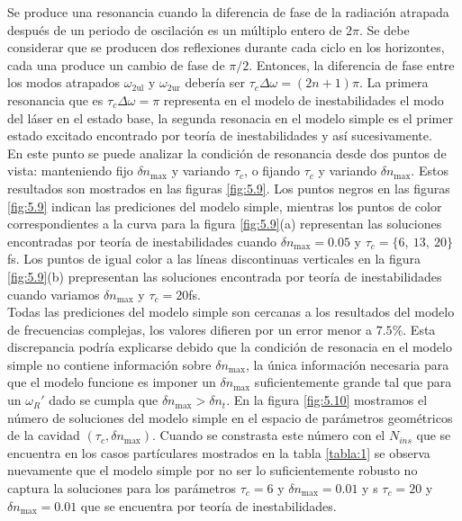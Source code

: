 Se produce una resonancia cuando la diferencia de fase de la radiación atrapada después de un periodo de oscilaci\'{o}n es un múltiplo entero de $2\pi$. Se debe considerar que se producen dos reflexiones durante cada ciclo en
los horizontes, cada una produce un cambio de fase de $\pi/2$. Entonces, la diferencia de fase entre los modos atrapados $ \omega_{\text{2ul}}$ y $\omega_{\text{2ur}}$ debería ser
$\tau_c \Delta \omega=(2n+1)\pi$. La primera resonancia que es $\tau_c \Delta \omega=\pi$ representa en el modelo de inestabilidades el modo del l\'{a}ser en el estado base, la segunda resonacia en el modelo simple es el primer estado excitado encontrado por teor\'{i}a de inestabilidades y as\'i sucesivamente.\\

En este punto se puede analizar la condici\'{o}n de resonancia desde dos puntos de vista: manteniendo fijo $\delta n_{\text{max}}$ y variando $\tau_c$, o fijando $\tau_c$ y variando $\delta n_{\text{max}}$. Estos resultados son mostrados en las figuras \ref{fig:5.9}. Los puntos negros en las figuras \ref{fig:5.9} indican las prediciones del modelo simple, mientras los puntos de color correspondientes a la curva para la figura \ref{fig:5.9}(a) representan las soluciones encontradas por teor\'{i}a de inestabilidades cuando  $\delta n_{\text{max}}=0.05$ y $\tau_c=\{6,\ 13,\ 20\}$fs. Los puntos de igual color a las l\'{i}neas discontinuas verticales en la figura \ref{fig:5.9}(b) prepresentan las soluciones encontrada por teor\'{i}a de inestabilidades cuando variamos $\delta n_{\text{max}}$ y $\tau_c=20$fs.\\

Todas las prediciones del modelo simple son cercanas a los resultados del modelo de frecuencias complejas, los valores difieren por un error menor a $7.5\%$. Esta discrepancia podr\'{i}a explicarse debido que la condici\'{o}n de resonacia en el modelo simple no contiene informaci\'{o}n sobre $\delta n_{\text{max}}$, la \'{u}nica informaci\'{o}n necesaria para que el modelo funcione es imponer un $\delta n_{\text{max}}$ suficientemente grande tal que para un $\omega_R'$ dado se cumpla que $\delta n_{\text{max}}>\delta n_{t}$. En la figura \ref{fig:5.10} mostramos el n\'{u}mero de soluciones del modelo simple en el espacio de par\'{a}metros geom\'{e}tricos de la cavidad $(\tau_c,\delta n_{\text{max}})$. Cuando se constrasta este n\'{u}mero con el $N_{ins}$ que se encuentra en los casos part\'{i}culares mostrados en la tabla \ref{tabla:1} se observa nuevamente que el modelo simple por no ser lo suficientemente robusto no captura la soluciones para los par\'{a}metros $\tau_c=6$ y $\delta n_{\max}=0.01$ y s $\tau_c=20$ y $\delta n_{\max}=0.01$ que se encuentra por teor\'{i}a de inestabilidades.\\

